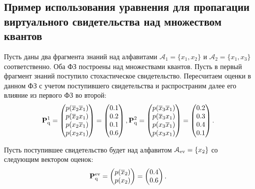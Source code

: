 \subsection*{Пример использования уравнения для пропагации виртуального свидетельства над множеством квантов}

Пусть даны два фрагмента знаний над алфавитами $\mathcal{A}_1 = \{x_1, x_2\}$ и $\mathcal{A}_2 = \{x_1, x_3\}$ соответственно. Оба ФЗ построены над множествами квантов. Пусть в первый фрагмент знаний поступило стохастическое свидетельство. Пересчитаем оценки в данном ФЗ с учетом поступившего свидетельства и распространим далее его влияние  из первого ФЗ во второй:
\begin{equation*}
\mathbf{P}_\mathrm{q}^{ 1} =  \begin{pmatrix}
p(\overline {x}_2\overline {x}_1)\\ p(\overline {x}_2x_1) \\ p(x_2\overline {x}_1) \\ p(x_2x_1)
\end{pmatrix} = \begin{pmatrix}
0.1 \\ 0.2\\ 0.1\\ 0.6
\end{pmatrix},
\mathbf{P}_\mathrm{q}^{2} =  \begin{pmatrix}
p(\overline{x}_3\overline{x}_1) \\ p(\overline{x}_3x_1)\\ p(x_3\overline{x}_1) \\ p(x_3x_1)
\end{pmatrix} = \begin{pmatrix}
0.2 \\ 0.3\\ 0.4\\ 0.1 
\end{pmatrix}.
\end{equation*}

Пусть поступившее свидетельство будет над алфавитом
$\mathcal{A}_{\mathrm{ev}} = \{x_2\}$ со следующим вектором оценок:
\begin{equation*}
\mathbf{P}_\mathrm{q}^{\mathrm{ev}} = \begin{pmatrix}  p(\overline {x}_2) \\ p(x_2)	\end{pmatrix} = \begin{pmatrix}
0.4 \\ 0.6
\end{pmatrix}.
\end{equation*}


